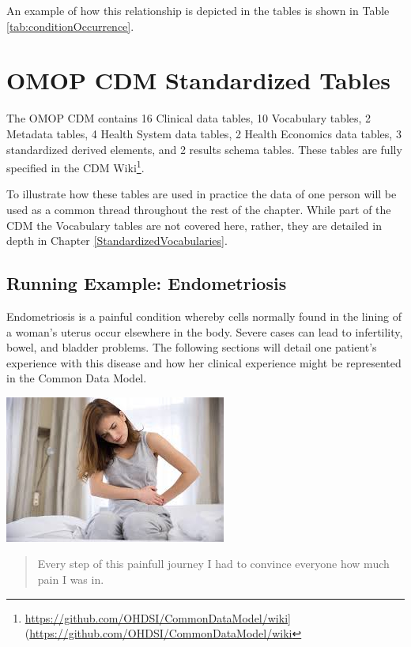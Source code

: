 \documentclass[11pt]{book}
\let\rmarkdownfootnote\footnote%
\def\footnote{\protect\rmarkdownfootnote}
\begin{document}
An example of how this relationship is depicted in the tables is shown
in Table \ref{tab:conditionOccurrence}.

\section{OMOP CDM Standardized
Tables}\label{omop-cdm-standardized-tables}

The OMOP CDM contains 16 Clinical data tables, 10 Vocabulary tables, 2
Metadata tables, 4 Health System data tables, 2 Health Economics data
tables, 3 standardized derived elements, and 2 results schema tables.
These tables are fully specified in the CDM Wiki\footnote{\url{https://github.com/OHDSI/CommonDataModel/wiki}{]}(\url{https://github.com/OHDSI/CommonDataModel/wiki}}.

To illustrate how these tables are used in practice the data of one
person will be used as a common thread throughout the rest of the
chapter. While part of the CDM the Vocabulary tables are not covered
here, rather, they are detailed in depth in Chapter
\ref{StandardizedVocabularies}.

\subsection{Running Example:
Endometriosis}\label{running-example-endometriosis}

Endometriosis is a painful condition whereby cells normally found in the
lining of a woman's uterus occur elsewhere in the body. Severe cases can
lead to infertility, bowel, and bladder problems. The following sections
will detail one patient's experience with this disease and how her
clinical experience might be represented in the Common Data Model.

\begin{center}\includegraphics[width=0.5\linewidth]{images/CommonDataModel/Lauren} \end{center}

\begin{quote}
Every step of this painfull journey I had to convince everyone how much
pain I was in.
\end{quote}
\end{document}

